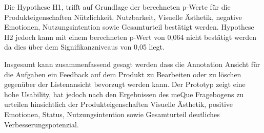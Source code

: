 Die Hypothese H1, trifft auf Grundlage der berechneten p-Werte für die Produkteigenschaften Nützlichkeit, Nutzbarkeit, Visuelle Ästhetik, negative Emotionen, Nutzungsintention sowie Gesamturteil bestätigt werden.
Hypothese H2 jedoch kann mit einem berechneten p-Wert von 0,064 nicht bestätigt werden da dies über dem Signifikanzniveaus von 0,05 liegt. 

Insgesamt kann zusammenfassend gesagt werden dass die Annotation Ansicht für die Aufgaben ein Feedback auf dem Produkt zu Bearbeiten oder zu löschen gegenüber der Listenansicht bevorzugt werden kann. 
Der Prototyp zeigt eine hohe Usability, hat jedoch nach den Ergebnissen des meQue Fragebogens zu urteilen hinsichtlich der Produkteigenschaften Visuelle Ästhetik, positive Emotionen, Status, Nutzungsintention sowie 
Gesamturteil deutliches Verbesserungspotenzial.
 

